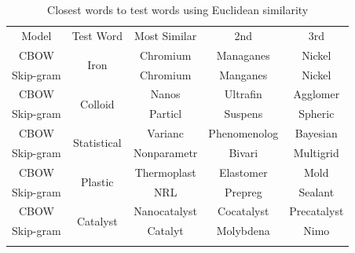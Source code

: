 \begin{table}[h!]
\begin{center}
\caption[Word similarity examinations with euclidean similarity]{Closest words to test words using Euclidean similarity}
\label{tab:EUCLIDSIMS}
\begin{tabular}{||c||c|c|c|c||}
\hline
Model     & Test Word              & Most Similar & 2nd & 3rd \\ \hhline{||=||=|=|=|=||}
CBOW      & \multirow{2}{*}{Iron} & Chromium             &  Managanes   &   Nickel  \\ \cline{1-1} \cline{3-5} 
Skip-gram &                   &  Chromium            &   Manganes  &  Nickel   \\ 
\hhline{||=||=|=|=|=||}
CBOW      & \multirow{2}{*}{Colloid} & Nanos             &  Ultrafin   &   Agglomer  \\ \cline{1-1} \cline{3-5} 
Skip-gram &                   &  Particl            &   Suspens  &  Spheric   \\ 
\hhline{||=||=|=|=|=||}
CBOW      & \multirow{2}{*}{Statistical} & Varianc             &  Phenomenolog   &   Bayesian  \\ \cline{1-1} \cline{3-5} 
Skip-gram &                   &  Nonparametr            &   Bivari  &  Multigrid   \\ 
\hhline{||=||=|=|=|=||}
CBOW      & \multirow{2}{*}{Plastic} & Thermoplast             &  Elastomer   & Mold    \\ \cline{1-1} \cline{3-5} 
Skip-gram &                   &  NRL            &   Prepreg  &  Sealant   \\ 
\hhline{||=||=|=|=|=||}
CBOW      & \multirow{2}{*}{Catalyst} & Nanocatalyst             &  Cocatalyst   & Precatalyst    \\ \cline{1-1} \cline{3-5} 
Skip-gram &                   &  Catalyt            &   Molybdena  &  Nimo   \\ 
\hhline{||=||=|=|=|=||}
\end{tabular}
\end{center}
\end{table}

